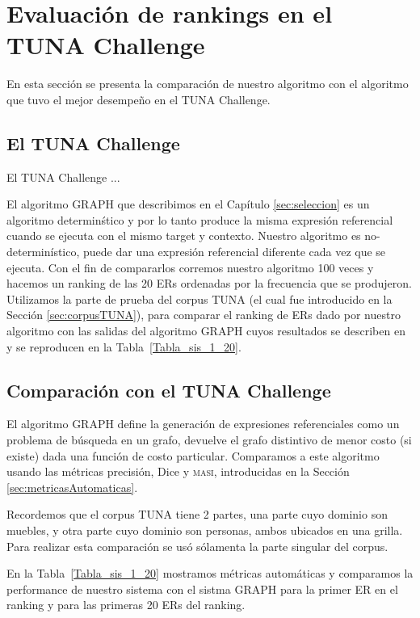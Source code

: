 \begin{table}[H]
\section{Evaluaci\'on de rankings en el TUNA Challenge} \label{sec:automaticevaluation}

En esta secci\'on se presenta la comparaci\'on de nuestro algoritmo con el algoritmo que tuvo el mejor desempe\~no en el TUNA Challenge. 

\subsection{El TUNA Challenge}
El TUNA Challenge ...

El algoritmo GRAPH que describimos en el Cap\'itulo \ref{sec:seleccion} es un algoritmo determin\'stico y por lo tanto produce la misma expresi\'on referencial cuando se ejecuta con el mismo target y contexto. Nuestro algoritmo es no-determin\'istico, puede dar una expresi\'on referencial diferente cada vez que se ejecuta. Con el fin de compararlos corremos nuestro algoritmo 100 veces y hacemos un ranking de las 20 ERs ordenadas por la frecuencia que se produjeron. Utilizamos la parte de prueba del corpus TUNA (el cual fue introducido en la Secci\'on \ref{sec:corpusTUNA}), para comparar el ranking de ERs dado por nuestro algoritmo con las salidas del algoritmo GRAPH cuyos resultados se describen en~\cite{KrahmerGRAPH} y se reproducen en la Tabla~\ref{Tabla_sis_1_20}.


\subsection{Comparaci\'on con el TUNA Challenge}
El algoritmo GRAPH define la generaci\'on de expresiones referenciales como un problema de b\'usqueda en un grafo, devuelve el grafo distintivo de menor costo (si existe) dada una funci\'on de costo particular. Comparamos a este algoritmo usando las m\'etricas precisi\'on, Dice y \textsc {masi}, introducidas en la Secci\'on \ref{sec:metricasAutomaticas}. 

Recordemos que el corpus TUNA tiene 2 partes, una parte cuyo dominio son muebles, y otra parte cuyo dominio son personas, ambos ubicados en una grilla. Para realizar esta comparaci\'on se us\'o s\'olamenta la parte singular del corpus.

En la Tabla~\ref{Tabla_sis_1_20} mostramos m\'etricas autom\'aticas y comparamos la performance de nuestro sistema con el sistma GRAPH para la primer ER en el ranking y para las primeras 20 ERs del ranking.


\end{table}
